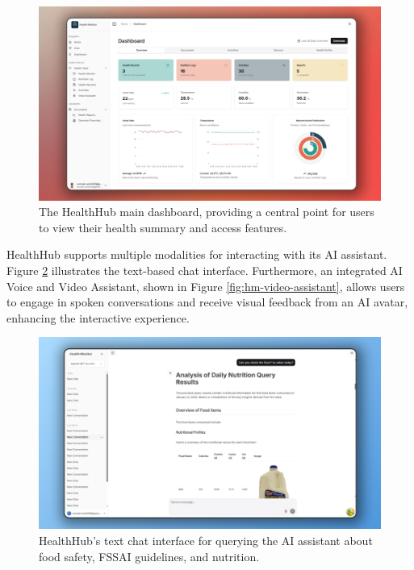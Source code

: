 \begin{figure}[!t]
\centering
\includegraphics[width=0.9\columnwidth]{figures/hm-dashboard.png} %
\caption{The HealthHub main dashboard, providing a central point for users to view their health summary and access features.}
\label{fig:hm-dashboard}
\end{figure}

HealthHub supports multiple modalities for interacting with its AI assistant. Figure \ref{fig:hm-chat} illustrates the text-based chat interface. Furthermore, an integrated AI Voice and Video Assistant, shown in Figure \ref{fig:hm-video-assistant}, allows users to engage in spoken conversations and receive visual feedback from an AI avatar, enhancing the interactive experience.

\begin{figure}[!t]
\centering
\includegraphics[width=0.9\columnwidth]{figures/hm-chat.png} %
\caption{HealthHub's text chat interface for querying the AI assistant about food safety, FSSAI guidelines, and nutrition.}
\label{fig:hm-chat}
\end{figure}

